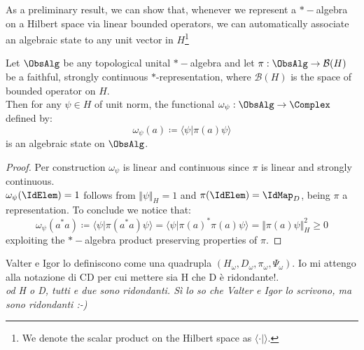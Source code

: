 \documentclass[Main]{subfiles}
\begin{document}
				\vspace{3mm}
				As a preliminary result, we can show that, whenever we represent a $\ast-$algebra on a Hilbert space via linear bounded operators, we can automatically associate an algebraic state to any unit vector in $H$\footnote{We denote the scalar product on the Hilbert space as $\langle \cdot \vert \rangle$.}
				\begin{proposition}
					Let $\ObsAlg$ be any topological unital $\ast-$algebra and
					let $\pi: \ObsAlg \rightarrow \mathcal{B}(H)$ be a faithful, strongly continuous $\ast$-representation,
					where $ \mathcal{B}(H)$ is the space of bounded operator on $H$.\\
					Then for any $\psi \in H$ of unit norm, the functional $\omega_\psi : \ObsAlg \rightarrow \Complex$ defined by:
					\begin{displaymath}
						\omega_\psi ( a) \coloneqq  \langle \psi \vert \pi( a ) \psi \rangle
					\end{displaymath}
					is an algebraic state on $\ObsAlg$.
				\end{proposition}
				\begin{proof}
				Per construction $\omega_\psi$ is linear and continuous since $\pi$ is linear and strongly continuous.\\
				$\omega_\psi (\IdElem)= 1$ follows from $\Vert \psi \Vert_H = 1$  and $\pi(\IdElem)= \IdMap_D$, being $\pi$ a representation. To conclude we notice that:
				\begin{displaymath}
					\omega_\psi ( a^* a) \coloneqq \langle \psi \vert \pi( a^* a) \psi \rangle = \langle \psi | \pi(a)^* \pi(a) \psi \rangle = \Vert \pi(a)\psi \Vert^2_H \geq 0
				\end{displaymath}
					exploiting the $\ast-$algebra product preserving properties of $\pi$.
				\end{proof}
\ifToninus
				\begin{Warning}
					Valter e Igor lo definiscono come una quadrupla $\left( H_\omega, D_\omega, \pi_\omega, \Psi_\omega \right)$.
					Io mi attengo alla notazione di CD per cui mettere sia H che D è ridondante!.\\
					\emph{od H o D, tutti e due sono ridondanti. Sì lo so che Valter e Igor lo scrivono, ma sono ridondanti :-)}
				\end{Warning}
\fi
\end{document}
